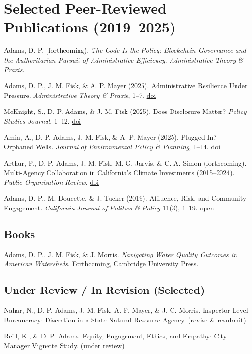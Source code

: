 \documentclass[12pt,letterpaper]{article}
\renewenvironment{itemize}{
  \begin{list}{}{
    \setlength{\leftmargin}{1.2em}
    \setlength{\itemsep}{0.15em}
    \setlength{\parskip}{0pt}
    \setlength{\parsep}{0.15em}
  }
}{
  \end{list}
}
\begin{document}
\section*{Selected Peer-Reviewed Publications (2019--2025)}
\begin{itemize}
  \item Adams, D. P. (forthcoming). \emph{The Code Is the Policy: Blockchain Governance and the Authoritarian Pursuit of Administrative Efficiency}. \emph{Administrative Theory \& Praxis}.
  \item Adams, D. P., J. M. Fisk, \& A. P. Mayer (2025). Administrative Resilience Under Pressure. \emph{Administrative Theory \& Praxis}, 1--7. \href{https://doi.org/10.1080/10841806.2025.2537600}{doi}
  \item McKnight, S., D. P. Adams, \& J. M. Fisk (2025). Does Disclosure Matter? \emph{Policy Studies Journal}, 1--12. \href{https://doi.org/10.1111/psj.70064}{doi}
  \item Amin, A., D. P. Adams, J. M. Fisk, \& A. P. Mayer (2025). Plugged In? Orphaned Wells. \emph{Journal of Environmental Policy \& Planning}, 1--14. \href{https://doi.org/10.1080/1523908X.2025.2480289}{doi}
  \item Arthur, P., D. P. Adams, J. M. Fisk, M. G. Jarvis, \& C. A. Simon (forthcoming). Multi-Agency Collaboration in California's Climate Investments (2015--2024). \emph{Public Organization Review}. \href{https://doi.org/10.1007/s11115-025-00586-3}{doi}
  \item Adams, D. P., M. Doucette, \& J. Tucker (2019). Affluence, Risk, and Community Engagement. \emph{California Journal of Politics \& Policy} 11(3), 1--19. \href{https://escholarship.org/uc/item/2mz2n6qk}{open}
\end{itemize}

\subsection*{Books}
\begin{itemize}
  \item Adams, D. P., J. M. Fisk, \& J. Morris. \emph{Navigating Water Quality Outcomes in American Watersheds}. Forthcoming, Cambridge University Press.
\end{itemize}

\subsection*{Under Review / In Revision (Selected)}
\begin{itemize}
  \item Nahar, N., D. P. Adams, J. M. Fisk, A. F. Mayer, \& J. C. Morris. Inspector-Level Bureaucracy: Discretion in a State Natural Resource Agency. (revise \& resubmit)
  \item Reill, K., \& D. P. Adams. Equity, Engagement, Ethics, and Empathy: City Manager Vignette Study. (under review)
\end{itemize}
\end{document}
